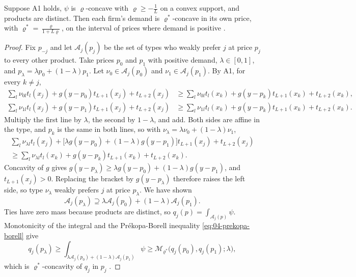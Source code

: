 \begin{theorem}\label{thm:04-cn-demand}
Suppose A1 holds, $\psi$ is $\varrho$-concave with $\varrho \ge -\frac{1}{L}$ on a convex support, and products are
distinct. Then each firm's demand is $\varrho^*$-concave in its own price, with $\varrho^* = \frac{\varrho}{1 + L\varrho}$, on
the interval of prices where demand is positive \citep[Theorem 1]{CaplinNalebuff1991}.
\end{theorem}

\begin{proof}
Fix $p_{-j}$ and let $\mathcal{A}_j(p_j)$ be the set of types who weakly prefer $j$ at price $p_j$ to every other
product. Take prices $p_0$ and $p_1$ with positive demand, $\lambda \in [0,1]$, and
$p_\lambda = \lambda p_0 + (1 - \lambda)p_1$. Let $\nu_0 \in \mathcal{A}_j(p_0)$ and $\nu_1 \in \mathcal{A}_j(p_1)$.
By A1, for every $k \neq j$,
\begin{align*}
  \sum_l \nu_{0l}t_l(x_j) + g(y - p_0)t_{L+1}(x_j) + t_{L+2}(x_j) &\ge \sum_l \nu_{0l}t_l(x_k) + g(y - p_k)t_{L+1}(x_k) + t_{L+2}(x_k),\\
  \sum_l \nu_{1l}t_l(x_j) + g(y - p_1)t_{L+1}(x_j) + t_{L+2}(x_j) &\ge \sum_l \nu_{1l}t_l(x_k) + g(y - p_k)t_{L+1}(x_k) + t_{L+2}(x_k).
\end{align*}
Multiply the first line by $\lambda$, the second by $1 - \lambda$, and add. Both sides are affine in the type,
and $p_k$ is the same in both lines, so with $\nu_\lambda = \lambda\nu_0 + (1 - \lambda)\nu_1$,
\begin{multline*}
  \sum_l \nu_{\lambda l}t_l(x_j) + \bigl[\lambda g(y - p_0) + (1 - \lambda)g(y - p_1)\bigr]t_{L+1}(x_j) + t_{L+2}(x_j)\\
  \ge \sum_l \nu_{\lambda l}t_l(x_k) + g(y - p_k)t_{L+1}(x_k) + t_{L+2}(x_k).
\end{multline*}
Concavity of $g$ gives $g(y - p_\lambda) \ge \lambda g(y - p_0) + (1 - \lambda)g(y - p_1)$, and $t_{L+1}(x_j) > 0$.
Replacing the bracket by $g(y - p_\lambda)$ therefore raises the left side, so type $\nu_\lambda$ weakly prefers
$j$ at price $p_\lambda$. We have shown
\[
  \mathcal{A}_j(p_\lambda) \supseteq \lambda\mathcal{A}_j(p_0) + (1 - \lambda)\mathcal{A}_j(p_1).
\]
Ties have zero mass because products are distinct, so $q_j(p) = \int_{\mathcal{A}_j(p)}\psi$.
Monotonicity of the integral and the Pr\'ekopa-Borell inequality \eqref{eq:04-prekopa-borell} give
\[
  q_j(p_\lambda) \ge \int_{\lambda\mathcal{A}_j(p_0) + (1 - \lambda)\mathcal{A}_j(p_1)}\psi
  \ge \mathcal{M}_{\varrho^*}\bigl(q_j(p_0), q_j(p_1); \lambda\bigr),
\]
which is $\varrho^*$-concavity of $q_j$ in $p_j$ \citep[p.~28]{CaplinNalebuff1991}.
\end{proof}

